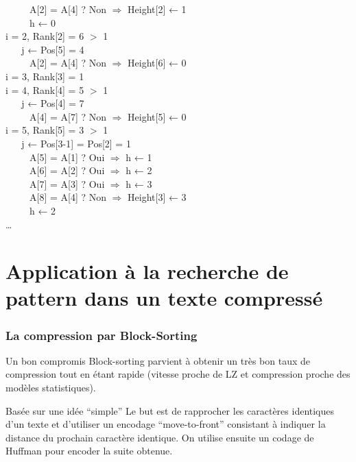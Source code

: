 \documentclass[10pt]{beamer}
\begin{document}
\begin{frame}
\begin{multicols}{2}
  ~ ~ ~ A[2] = A[4] ? Non $\Rightarrow$ Height[2] ← 1\\
  ~ ~ ~ h ← 0\\
  \pause
  i = 2, Rank[2] = 6 $>$ 1\\
  ~ ~ j ← Pos[5] = 4\\
  ~ ~ ~ A[2] = A[4] ? Non $\Rightarrow$ Height[6] ← 0\\
  \pause
  i = 3, Rank[3] = 1\\
  \pause
  i = 4, Rank[4] = 5 $>$ 1\\
  ~ ~ j ← Pos[4] = 7\\
  ~ ~ ~ A[4] = A[7] ? Non $\Rightarrow$ Height[5] ← 0\\
  \pause
  i = 5, Rank[5] = 3 $>$ 1\\
  ~ ~ j ← Pos[3-1] = Pos[2] = 1\\
  ~ ~ ~ A[5] = A[1] ? Oui $\Rightarrow$ h ← 1\\
  ~ ~ ~ A[6] = A[2] ? Oui $\Rightarrow$ h ← 2\\
  ~ ~ ~ A[7] = A[3] ? Oui $\Rightarrow$ h ← 3\\
  ~ ~ ~ A[8] = A[4] ? Non $\Rightarrow$ Height[3] ← 3\\
  ~ ~ ~ h ← 2\\
  \pause
  \ldots

  \end{multicols}
  \normalsize
\end{frame}


\section{Application à la recherche de pattern dans un texte compressé}
\label{sec:appcompress}

\begin{frame}
  \frametitle{La compression par Block-Sorting}

  \begin{block}{Un bon compromis}
    Block-sorting parvient à obtenir un très bon taux de compression
    tout en étant rapide (vitesse proche de LZ et compression proche
    des modèles statistiques\cite{Burrows94}).
  \end{block}

  \begin{block}{Basée sur une idée ``simple''}
    Le but est de rapprocher les caractères identiques d'un texte et
    d'utiliser un encodage ``move-to-front'' consistant à indiquer la
    distance du prochain caractère identique. On utilise ensuite un
    codage de Huffman pour encoder la suite obtenue.
  \end{block}


\end{frame}
\end{document}
